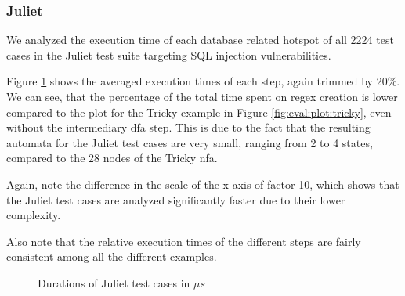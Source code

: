\subsubsection{Juliet}

We analyzed the execution time of each database related hotspot of all 2224 test cases in the Juliet test suite targeting SQL injection vulnerabilities.

Figure \ref{fig:eval:plot:juliet} shows the averaged execution times of each step, again trimmed by 20\%.
We can see, that the percentage of the total time spent on regex creation is lower compared to the plot for the Tricky example in Figure \ref{fig:eval:plot:tricky}, even without the intermediary \ac{dfa} step. This is due to the fact that the resulting automata for the Juliet test cases are very small, ranging from 2 to 4 states, compared to the 28 nodes of the Tricky \ac{nfa}.

Again, note the difference in the scale of the x-axis of factor 10, which shows that the Juliet test cases are analyzed significantly faster due to their lower complexity.

Also note that the relative execution times of the different steps are fairly consistent among all the different examples.


\begin{figure}
	\caption{Durations of Juliet test cases in $\mu s$}
	\label{fig:eval:plot:juliet}
\end{figure}

